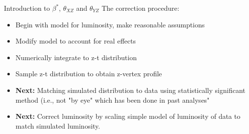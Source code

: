 \begin{frame}{Introduction to $\beta^{*}$,  $\theta_{XZ}$ and $\theta_{YZ}$}
The correction procedure:
\begin{itemize}
\item Begin with model for luminosity, make reasonable assumptions
\item Modify model to account for real effects
\item Numerically integrate to z-t distribution
\item Sample z-t distribution to obtain z-vertex profile
\item \textbf{Next:} Matching simulated distribution to data using statistically
	significant method (i.e., not "by eye" which has been done in past
	analyses"
\item \textbf{Next:} Correct luminosity by scaling simple model of luminosity of data to
	match simulated luminosity.
\end{itemize}
\end{frame}

